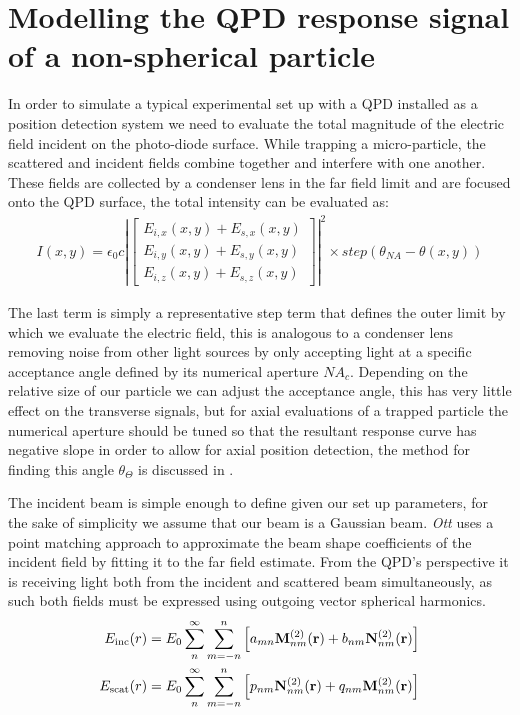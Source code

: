 \section{Modelling the QPD response signal of a non-spherical particle}
In order to simulate a typical experimental set up with a QPD 
installed as a position detection system we need to evaluate 
the total magnitude of the electric field incident on the 
photo-diode surface. While trapping a micro-particle, the 
scattered and incident fields combine together and interfere 
with one another. These fields are collected by a condenser 
lens in the far field limit and are focused onto the QPD 
surface, the total intensity can be evaluated as:
\begin{align}
	I(x,y) = \epsilon_0c\left|
	\begin{bmatrix} 
		E_{i,x}(x,y)+E_{s,x}(x,y) \\ 
		E_{i,y}(x,y)+E_{s,y}(x,y) \\ 
		E_{i,z}(x,y)+E_{s,z}(x,y)
	\end{bmatrix} \right|^2 \times step(\theta_{NA}-\theta(x,y))
\end{align}

The last term is simply a representative step term that defines 
the outer limit by which we evaluate the electric field, this is 
analogous to a condenser lens removing noise from other light 
sources by only accepting light at a specific acceptance angle 
defined by its numerical aperture $NA_c$. Depending on the 
relative size of our particle we can adjust the acceptance angle, 
this has very little effect on the transverse signals, but for 
axial evaluations of a trapped particle the numerical aperture 
should be tuned so that the resultant response curve has negative 
slope in order to allow for axial position detection, the method 
for finding this angle $\theta_\Theta$ is discussed in 
\cite{Friedrich2012}.

The incident beam is simple enough to define given our set up 
parameters, for the sake of simplicity we assume that our beam is a 
Gaussian beam. \textit{Ott} uses a point matching approach to 
approximate the beam shape coefficients of the incident field by 
fitting it to the far field estimate. From the QPD's perspective 
it is receiving light both from the incident and scattered beam simultaneously, as such both fields must be expressed using outgoing 
vector spherical harmonics.
\begin{align}
	E_{\rm inc}(r)&=
	E_0\sum^\infty_{n}\sum^n_{m=-n}\left[a_{mn}{\bf M}^{(2)}_{nm}({\bf r})+
	b_{nm}{\bf N}^{(2)}_{nm}({\bf r}) \right] 
	\\
	E_{\rm scat}(r)&=E_0 \sum^\infty_n \sum^n_{m=-n} \left[
	p_{nm}{\bf N}_{nm}^{(2)}({\bf r})+q_{nm}{\bf M}_{nm}^{(2)}({\bf r})
	\right] 
\end{align}

